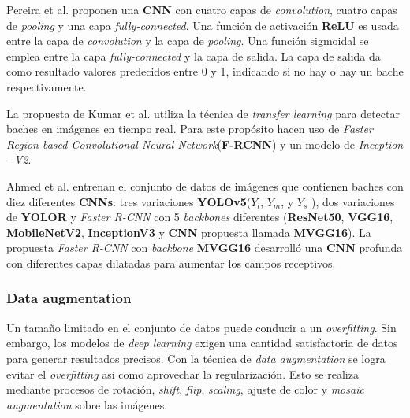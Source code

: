 	Pereira et al. proponen una \textbf{CNN} con cuatro capas de \emph{convolution}, cuatro
	capas de \emph{pooling} y una capa \emph{fully-connected}. Una función de activación \textbf{ReLU} es usada entre 
	la capa de \emph{convolution} y la capa de \emph{pooling}. Una función sigmoidal se emplea entre la capa \emph{fully-connected}
	y la capa de salida. La capa de salida da como resultado  valores predecidos entre 0 y 1, indicando si no hay o hay un bache respectivamente.
	
	La propuesta de Kumar et al. utiliza la técnica de \emph{transfer learning} para detectar baches en imágenes 
	en tiempo real. Para este propósito hacen uso de \emph{Faster Region-based Convolutional Neural Network}(\textbf{F-RCNN}) y un modelo de
	\emph{Inception - V2}. 
	
	Ahmed et al. entrenan el conjunto de datos de imágenes que contienen baches con diez diferentes 
	\textbf{CNNs}: tres variaciones  \textbf{YOLOv5}($Y_l$, $Y_m$, y $Y_s$ ), dos variaciones de \textbf{YOLOR} y \emph{Faster R-CNN} 
	con 5 \emph{backbones} diferentes (\textbf{ResNet50}, \textbf{VGG16}, \textbf{MobileNetV2}, \textbf{InceptionV3}  y  \textbf{CNN} 
	propuesta llamada  \textbf{MVGG16}). La propuesta \emph{Faster R-CNN} con \emph{backbone} \textbf{MVGG16} desarrolló una 
	\textbf{CNN} profunda con diferentes capas dilatadas para aumentar los campos receptivos.

		\subsubsection{Data augmentation}
			Un tamaño limitado en el conjunto de datos puede conducir a un \emph{overfitting}. Sin embargo, los modelos de \emph{deep learning}
			exigen una cantidad satisfactoria de datos para generar resultados precisos. Con la técnica de \emph{data augmentation} se logra evitar 
			el \emph{overfitting} asi como aprovechar la regularización. 
			Esto se realiza mediante procesos de rotación, \emph{shift}, 
			\emph{flip}, \emph{scaling}, ajuste de color y 
			\emph{mosaic augmentation} sobre las imágenes.

